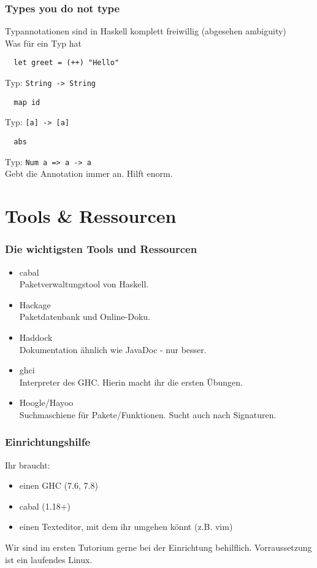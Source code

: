 \documentclass[10pt]{beamer}
\begin{document}
\begin{frame}[fragile]
 \frametitle{Types you do not type}
 Typannotationen sind in Haskell komplett freiwillig (abgesehen ambiguity)\\\vspace*{0.5cm}
 \pause
 Was für ein Typ hat
 \begin{lstlisting}
  let greet = (++) "Hello"
 \end{lstlisting}
 \pause
 Typ: \texttt{String -> String}
 \pause
 \begin{lstlisting}
  map id
 \end{lstlisting}
 \pause
 Typ: \texttt{[a] -> [a]}
 \pause
 \begin{lstlisting}
  abs
 \end{lstlisting}
 \pause
 Typ: \texttt{Num a => a -> a}\\
 \pause
 Gebt die Annotation immer an. Hilft enorm.
\end{frame}

\section{Tools \& Ressourcen}
\begin{frame}[fragile]
 \frametitle{Die wichtigsten Tools und Ressourcen}
 \pause
 \begin{itemize}
  \item cabal \\
	Paketverwaltungstool von Haskell.
  \pause
  \item Hackage \\
	Paketdatenbank und Online-Doku.
  \pause
  \item Haddock \\
	Dokumentation ähnlich wie JavaDoc - nur besser.
  \pause
  \item ghci \\
	Interpreter des GHC. Hierin macht ihr die ersten Übungen.
  \pause
  \item Hoogle/Hayoo \\
	Suchmaschiene für Pakete/Funktionen. Sucht auch nach Signaturen.
 \end{itemize}
\end{frame}

\begin{frame}[fragile]
 \frametitle{Einrichtungshilfe}
 Ihr braucht:\\
 \begin{itemize}
  \item einen GHC (7.6, 7.8)
  \item cabal (1.18+)
  \item einen Texteditor, mit dem ihr umgehen könnt (z.B. vim)
 \end{itemize}
 Wir sind im ersten Tutorium gerne bei der Einrichtung behilflich. Vorraussetzung ist ein laufendes Linux.
\end{frame}
\end{document}
